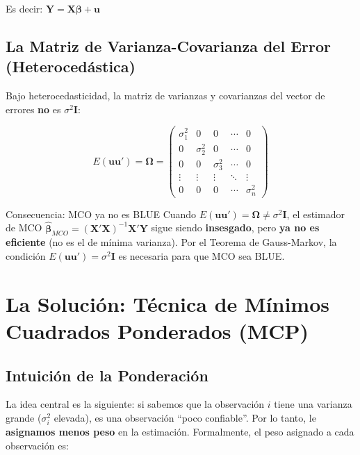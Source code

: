 \documentclass[12pt,a4paper]{article}
\begin{document}
Es decir: $\mathbf{Y} = \mathbf{X}\boldsymbol{\beta} + \mathbf{u}$

\subsection{La Matriz de Varianza-Covarianza del Error (Heterocedástica)}

Bajo heterocedasticidad, la matriz de varianzas y covarianzas del vector de errores \textbf{no} es $\sigma^2 \mathbf{I}$:

\begin{equation}
E(\mathbf{u}\mathbf{u}') = \boldsymbol{\Omega} =
\begin{pmatrix}
\sigma_1^2 & 0 & 0 & \cdots & 0 \\
0 & \sigma_2^2 & 0 & \cdots & 0 \\
0 & 0 & \sigma_3^2 & \cdots & 0 \\
\vdots & \vdots & \vdots & \ddots & \vdots \\
0 & 0 & 0 & \cdots & \sigma_n^2
\end{pmatrix}
\end{equation}

\begin{advertencia}{Consecuencia: MCO ya no es BLUE}
Cuando $E(\mathbf{u}\mathbf{u}') = \boldsymbol{\Omega} \neq \sigma^2\mathbf{I}$, el estimador de MCO $\hat{\boldsymbol{\beta}}_{MCO} = (\mathbf{X}'\mathbf{X})^{-1}\mathbf{X}'\mathbf{Y}$ sigue siendo \textbf{insesgado}, pero \textbf{ya no es eficiente} (no es el de mínima varianza). Por el Teorema de Gauss-Markov, la condición $E(\mathbf{u}\mathbf{u}')=\sigma^2\mathbf{I}$ es necesaria para que MCO sea BLUE.
\end{advertencia}

\section{La Solución: Técnica de Mínimos Cuadrados Ponderados (MCP)}

\subsection{Intuición de la Ponderación}

La idea central es la siguiente: si sabemos que la observación $i$ tiene una varianza grande ($\sigma_i^2$ elevada), es una observación ``poco confiable''. Por lo tanto, le \textbf{asignamos menos peso} en la estimación. Formalmente, el peso asignado a cada observación es:
\end{document}
